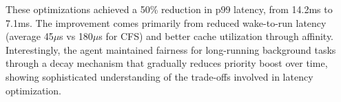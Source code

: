 These optimizations achieved a 50\% reduction in p99 latency, from 14.2ms to 7.1ms. The improvement comes primarily from reduced wake-to-run latency (average 45$\mu$s vs 180$\mu$s for CFS) and better cache utilization through affinity. Interestingly, the agent maintained fairness for long-running background tasks through a decay mechanism that gradually reduces priority boost over time, showing sophisticated understanding of the trade-offs involved in latency optimization.

